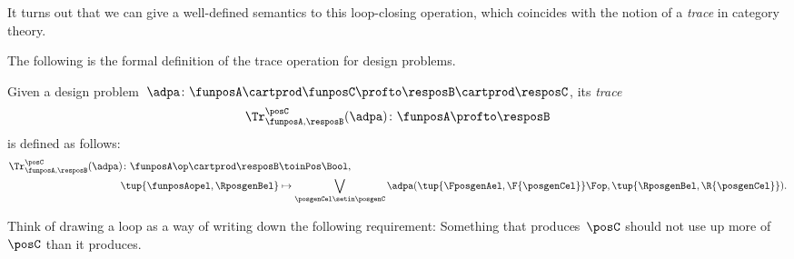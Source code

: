 It turns out that we can give a well-defined semantics to this loop-closing operation, which coincides with the notion of a \emph{trace} in category theory.

The following is the formal definition of the trace operation for design problems.

\begin{definition}
    \label{def:dp-trace}
    Given a design problem~$\adpa\colon \funposA \cartprod \funposC \profto \resposB \cartprod \resposC$, its \emph{trace}
    \begin{equation}
        \Tr_{\funposA,\resposB}^\posC(\adpa) \colon \funposA \profto \resposB
    \end{equation}
    is defined as follows:
    \begin{equation}
        \label{eq:tracedef}
        \begin{aligned}
            \Tr_{\funposA,\resposB}^\posC(\adpa) \colon  \funposA\op \cartprod \resposB & \toinPos \Bool, \\
            \tup{\funposAopel, \RposgenBel}                                             & \mapsto \bigvee_{\posgenCel \setin \posgenC}
            \adpa(\tup{\FposgenAel, \F{\posgenCel}}\Fop,
            \tup{\RposgenBel, \R{\posgenCel}}).
        \end{aligned}
    \end{equation}
\end{definition}

Think of drawing a loop as a way of writing down the following requirement:
Something that produces~$\posC$ should not use up more of~$\posC$ than it produces.

